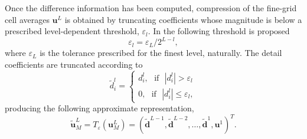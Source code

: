 \documentclass[]{article}
\begin{document}
        Once the difference information has been computed, compression of the
        fine-grid cell averages $\bm{u}^{L}$ is obtained by truncating
        coefficients whose magnitude is below a prescribed level-dependent
        threshold, $\varepsilon_{l}$.  In \cite{harten1994} the following
        threshold is proposed
        \begin{equation}
            \varepsilon_{l} = \varepsilon_{L} / 2^{L-l},
        \end{equation}
        where $\varepsilon_{L}$ is the tolerance prescribed for the finest
        level, naturally.  The detail coefficients are truncated according to
        \begin{equation}
            \tilde{d}^{l}_{i} =
                \begin{cases}
                    d^{l}_{i}, \text{ } \text{if} \text{ } |d^{l}_{i}| > \varepsilon_{l} \\
                    0, \text{ } \text{if} \text{ } |d^{l}_{i}| \leq
                    \varepsilon_{l},
                \end{cases}
        \end{equation}
        producing the following approximate representation,
        \begin{equation}
            \tilde{\bm{u}}^{L}_{M} = T_{\varepsilon}(\bm{u}^{L}_{M}) = \left(
            \tilde{\bm{d}}^{L-1}, \tilde{\bm{d}}^{L-2},
            \dots, \tilde{\bm{d}}^{1}, \bm{u}^{1} \right)^{T}.
        \end{equation}

%
\end{document}
